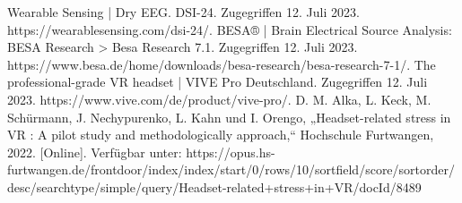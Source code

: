 \documentclass[conference]{IEEEtran}
\begin{document}
\begin{thebibliography}{00}
Wearable Sensing | Dry EEG. DSI-24. Zugegriffen 12. Juli 2023. https://wearablesensing.com/dsi-24/.
BESA® | Brain Electrical Source Analysis: BESA Research > Besa Research 7.1. Zugegriffen 12. Juli 2023. https://www.besa.de/home/downloads/besa-research/besa-research-7-1/.
The professional-grade VR headset | VIVE Pro Deutschland. Zugegriffen 12. Juli 2023. https://www.vive.com/de/product/vive-pro/.
D. M. Alka, L. Keck, M. Schürmann, J. Nechypurenko, L. Kahn und I. Orengo, „Headset-related stress in VR : A pilot study and methodologically approach,“ Hochschule Furtwangen, 2022. [Online]. Verfügbar unter: https://opus.hs-furtwangen.de/frontdoor/index/index/start/0/rows/10/sortfield/score/sortorder/desc/searchtype/simple/query/Headset-related+stress+in+VR/docId/8489

\end{thebibliography}
\end{document}
